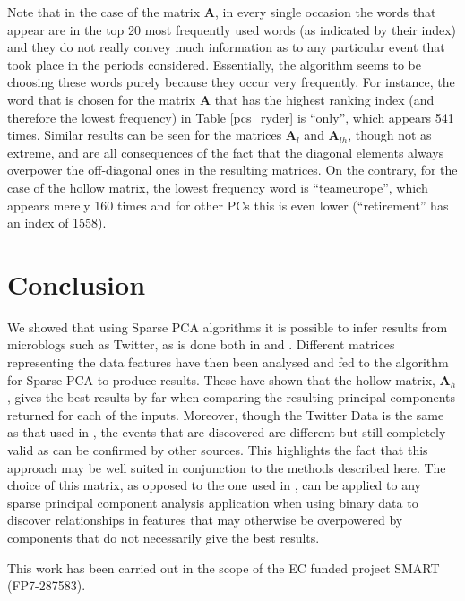 \documentclass[graybox]{svmult}
\newcommand{\covmat}{\mathbf{A}}
\begin{document}
Note that in the case of the matrix $\covmat$, in every single occasion the words that appear are in the top 20 most frequently used words (as indicated by their index) and they do not really convey much information as to any particular event that took place in the periods considered. Essentially, the algorithm seems to be choosing these words purely because they occur very frequently. For instance, the word that is chosen for the matrix $\covmat$ that has the highest ranking index (and therefore the lowest frequency) in Table \ref{pcs_ryder} is ``only'', which appears 541 times. Similar results can be seen for the matrices $\covmat_l$ and $\covmat_{lh}$, though not as extreme, and are all consequences of the fact that the diagonal elements always overpower the off-diagonal ones in the resulting matrices. On the contrary, for the case of the hollow matrix, the lowest frequency word is ``teameurope'', which appears merely 160 times and for other PCs this is even lower (``retirement'' has an index of 1558). 

\section{Conclusion}\label{conclusion}

We showed that using Sparse PCA algorithms it is possible to infer results from microblogs such as Twitter, as is done both in \cite{dimakis} and \cite{microblogs}. Different matrices representing the data features have then been analysed and fed to the algorithm for Sparse PCA to produce results. These have shown that the hollow matrix, $\covmat_h$, gives the best results by far when comparing the resulting principal components returned for each of the inputs. Moreover, though the Twitter Data is the same as that used in \cite{microblogs}, the events that are discovered are different but still completely valid as can be confirmed by other sources. This highlights the fact that this approach may be well suited in conjunction to the methods described here. The choice of this matrix, as opposed to the one used in \cite{dimakis}, can be applied to any sparse principal component analysis application when using binary data to discover relationships in features that may otherwise be overpowered by components that do not necessarily give the best results. 

\acknowledgement
This work has been carried out in the scope of the EC funded project SMART (FP7-287583). 




{}
\end{document}
